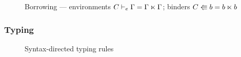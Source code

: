 \begin{figure}[tp]
  
  \caption{Borrowing --- environments $C \vdash_e \Gamma = \Gamma \ltimes \Gamma$; binders $C \Lleftarrow b = b \ltimes b$}
  \label{fig:sd-borrowing}
\end{figure}

\subsubsection{Typing}

\begin{figure*}[htp]
  
  \caption{Syntax-directed typing rules}
  \label{fig:syntax-directed-typing}
\end{figure*}

\clearpage

